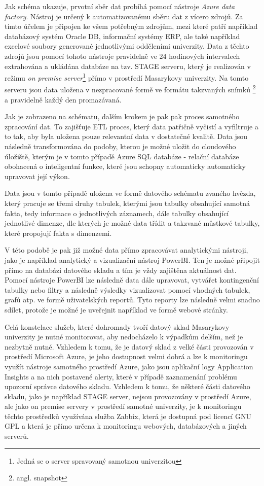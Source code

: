 \documentclass[
  digital,     %
  twoside,     %
  lof,         %
  lot,         %
]{fithesis4}
\begin{document}
Jak schéma ukazuje, prvotní sběr dat probíhá pomocí nástroje \emph{Azure data factory}. Nástroj je určený k automatizovanému sběru dat z vícero zdrojů. Za tímto účelem je připojen ke všem potřebným zdrojům, mezi které patří například databázový systém Oracle DB, informační systémy ERP, ale také například excelové soubory generované jednotlivými odděleními univerzity. Data z těchto zdrojů jsou pomocí tohoto nástroje pravidelně ve 24 hodinových intervalech extrahována a ukládána databáze na tzv. STAGE serveru, který je realizován v režimu \emph{on premise server}\footnote{Jedná se o server spravovaný samotnou univerzitou} přímo v prostředí Masarykovy univerzity. Na tomto serveru jsou data uložena v nezpracované formě ve formátu takzvaných snímků \footnote{angl. snapshot} a pravidelně každý den promazávaná.

Jak je zobrazeno na schématu, dalším krokem je pak pak proces samotného zpracování dat. To zajišťuje ETL proces, který data patřičně vyčistí a vyfiltruje a to tak, aby byla uložena pouze relevantní data v dostatečné kvalitě. Data jsou následně transformována do podoby, kterou je možné uložit do cloudového úložiště, kterým je v tomto případě Azure SQL databáze - relační databáze obohacená o inteligentní funkce, které jsou schopny automaticky automaticky upravovat její výkon.

Data jsou v tomto případě uložena ve formě datového schématu zvaného hvězda, který pracuje se třemi druhy tabulek, kterými jsou tabulky obsahující samotná fakta, tedy informace o jednotlivých záznamech, dále tabulky obsahující jednotlivé dimenze, dle kterých je možné data třídit a takzvané můstkové tabulky, které propojují fakta s dimenzemi. 

V této podobě je pak již možné data přímo zpracovávat analytickými nástroji, jako je například analytický a vizualizační nástroj PowerBI. Ten je možné připojit přímo na databázi datového skladu a tím je vždy zajištěna aktuálnost dat. Pomocí nástroje PowerBI lze následně data dále upravovat, vytvářet kontingenční tabulky nebo filtry a následně výsledky vizualizovat pomocí vhodných tabulek, grafů atp. ve formě uživatelských reportů. Tyto reporty lze následně velmi snadno sdílet, protože je možné je uveřejnit například ve formě webové stránky.

Celá konstelace služeb, které dohromady tvoří datový sklad Masarykovy univerzity je nutné monitorovat, aby nedocházelo k výpadkům delším, než je nezbytně nutné. Vzhledem k tomu, že je datový sklad z velké části provozován v prostředí Microsoft Azure, je jeho dostupnost velmi dobrá a lze k monitoringu využít nástroje samotného prostředí Azure, jako jsou aplikační logy Application Insights a na nich postavené alerty, které v případě zaznamenání problému upozorní správce datového skladu. Vzhledem k tomu, že některé části datového skladu, jako je například STAGE server, nejsou provozovány v prostředí Azure, ale jako on premise servery v prostředí samotné univerzity, je k monitoringu těchto prostředků využívána služba Zabbix, která je dostupná pod licencí GNU GPL a která je přímo  určena k monitoringu webových, databázových a jiných serverů.
\end{document}
